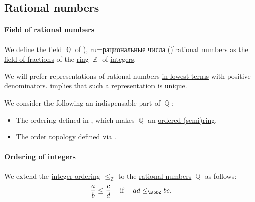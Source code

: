 \subsection{Rational numbers}\label{subsec:rational_numbers}

\paragraph{Field of rational numbers}

\begin{definition}\label{def:rational_numbers}
  We define the \hyperref[def:field]{field} \( \BbbQ \) of \term[bg=рационални числа (\cite[18]{Тагамлицки1971Диф}), ru=рациональные числа (\cite[def. 22.1]{АлександровМаркушевичХинчин1951ЭнциклопедияТом1})]{rational numbers} as the \hyperref[thm:field_of_fractions]{field of fractions} of the \hyperref[def:ring]{ring} \( \BbbZ \) of \hyperref[def:integers]{integers}.
\end{definition}
\begin{comments}
  \item We will prefer representations of rational numbers \hyperref[def:lowest_terms]{in lowest terms} with positive denominators.  implies that such a representation is unique.

  \item We consider the following an indispensable part of \( \BbbQ \):
  \begin{itemize}
    \item The ordering defined in , which makes \( \BbbQ \) an \hyperref[def:ordered_semiring]{ordered (semi)ring}.
    \item The order topology defined via .
  \end{itemize}
\end{comments}

\paragraph{Ordering of integers}

\begin{definition}\label{def:rational_numbers_ordering}
  We extend the \hyperref[def:integer_ordering]{integer ordering} \( \leq_\BbbZ \) to the \hyperref[def:rational_numbers]{rational numbers} \( \BbbQ \) as follows:
  \begin{equation*}
    \frac a b \leq \frac c d \quad\T{if}\quad ad \leq_\BbbZ bc.
  \end{equation*}
\end{definition}

